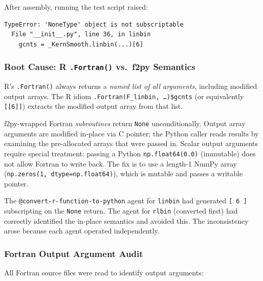 \documentclass[12pt,a4paper]{article}
\begin{document}
After assembly, running the test script raised:

\begin{lstlisting}[style=shell]
TypeError: 'NoneType' object is not subscriptable
  File "__init__.py", line 36, in linbin
    gcnts = _KernSmooth.linbin(...)[6]
\end{lstlisting}

\subsubsection{Root Cause: R \texttt{.Fortran()} vs.\ f2py Semantics}

R's \texttt{.Fortran()} always returns a \emph{named list of all arguments}, including modified output arrays. The R idiom \texttt{.Fortran(F\_linbin, \ldots)\$gcnts} (or equivalently \texttt{[[6]]}) extracts the modified output array from that list.

f2py-wrapped Fortran \emph{subroutines} return \texttt{None} unconditionally. Output array arguments are modified in-place via C pointer; the Python caller reads results by examining the pre-allocated arrays that were passed in. Scalar output arguments require special treatment: passing a Python \texttt{np.float64(0.0)} (immutable) does not allow Fortran to write back. The fix is to use a length-1 NumPy array (\texttt{np.zeros(1, dtype=np.float64)}), which is mutable and passes a writable pointer.

The \texttt{@convert-r-function-to-python} agent for \texttt{linbin} had generated \texttt{[\,6\,]} subscripting on the \texttt{None} return. The agent for \texttt{rlbin} (converted first) had correctly identified the in-place semantics and avoided this. The inconsistency arose because each agent operated independently.

\subsubsection{Fortran Output Argument Audit}

All Fortran source files were read to identify output arguments:
\end{document}

